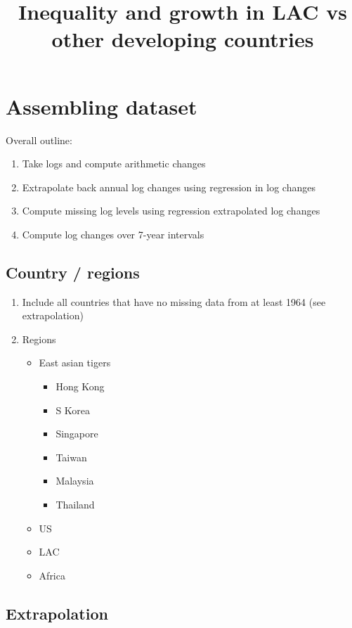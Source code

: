 \documentclass[12pt,english]{article}
\theoremstyle{remark}
\begin{document}
	
\title{Inequality and growth in LAC vs other developing countries}
\maketitle

\section{Assembling dataset}

Overall outline:
\begin{enumerate}
	\item Take logs and compute arithmetic changes
	\item Extrapolate back annual log changes using regression in log changes
	\item Compute missing log levels using regression extrapolated log changes
	\item Compute log changes over 7-year intervals
\end{enumerate}

\subsection{Country / regions}

\begin{enumerate}
	\item Include all countries that have no missing data from at least 1964 (see extrapolation)
	\item Regions
	\begin{itemize}
		\item East asian tigers
		\begin{itemize}
			\item Hong Kong
			\item S Korea
			\item Singapore
			\item Taiwan
			\item Malaysia
			\item Thailand
		\end{itemize}
		\item US
		\item LAC
		\item Africa
	\end{itemize}
\end{enumerate}


\subsection{Extrapolation}
\end{document}
